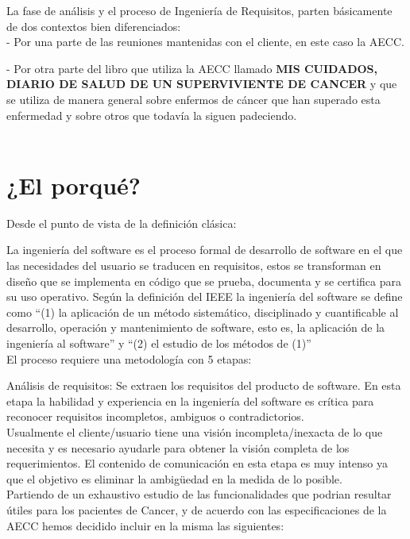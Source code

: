 \documentclass[../pfc.tex]{subfiles}
\begin{document}
	
La fase de análisis y el proceso de Ingeniería de Requisitos, parten básicamente de dos contextos bien diferenciados:\\
- Por una parte de las reuniones mantenidas con el cliente, en este caso la AECC.

- Por otra parte del libro que utiliza la AECC llamado \textbf{MIS CUIDADOS, DIARIO DE SALUD DE UN SUPERVIVIENTE DE CANCER} y que se utiliza de manera general sobre enfermos de cáncer que han superado esta enfermedad y sobre otros que todavía la siguen padeciendo.\\\\
	
	\section{¿El porqué?}
	
	Desde el punto de vista de la definición clásica:
	
	La ingeniería del software es el proceso formal de desarrollo de software en el que las necesidades del usuario se traducen en requisitos, estos se transforman en diseño que se implementa en código que se prueba, documenta y se certifica para su uso operativo. Según la definición del IEEE la ingeniería del software se define como “(1) la aplicación de un método sistemático, disciplinado y cuantificable al desarrollo, operación y mantenimiento de software, esto es, la aplicación de la ingeniería al software” y “(2) el estudio de los métodos de (1)”\\
	
	El proceso requiere una metodología con 5 etapas:
	
	Análisis de requisitos: Se extraen los requisitos del producto de software. En esta etapa la habilidad y experiencia en la ingeniería del software es crítica para reconocer requisitos incompletos, ambiguos o contradictorios.\\
	Usualmente el cliente/usuario tiene una visión incompleta/inexacta de lo que necesita y es necesario ayudarle para obtener la visión completa de los requerimientos.  El contenido de comunicación en esta etapa es muy intenso ya que el objetivo es eliminar la ambigüedad en la medida de lo posible.\\
	Partiendo de un exhaustivo estudio de las funcionalidades que podrian resultar útiles para los pacientes de Cancer, y de acuerdo con las especificaciones de la AECC hemos decidido incluir en la misma las siguientes:\\
	
\end{document}
